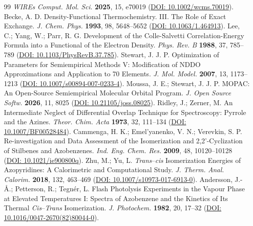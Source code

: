 \documentclass[11pt,a4paper]{article}
\begin{document}
\begin{thebibliography}{99}
  \textit{WIREs Comput. Mol. Sci.} \textbf{2025}, 15, e70019
  (\href{https://doi.org/10.1002/wcms.70019}{DOI: 10.1002/wcms.70019}).
 Becke, A. D. Density-Functional Thermochemistry. III. The Role of Exact Exchange.
  \textit{J. Chem. Phys.} \textbf{1993}, 98, 5648–5652
  (\href{https://doi.org/10.1063/1.464913}{DOI: 10.1063/1.464913}).
 Lee, C.; Yang, W.; Parr, R. G. Development of the Colle-Salvetti Correlation-Energy Formula
  into a Functional of the Electron Density. \textit{Phys. Rev. B} \textbf{1988}, 37, 785–789
  (\href{https://doi.org/10.1103/PhysRevB.37.785}{DOI: 10.1103/PhysRevB.37.785}).
 Stewart, J. J. P. Optimization of Parameters for Semiempirical Methods V: Modification
  of NDDO Approximations and Application to 70 Elements. \textit{J. Mol. Model.} \textbf{2007}, 13, 1173–1213
  (\href{https://doi.org/10.1007/s00894-007-0233-4}{DOI: 10.1007/s00894-007-0233-4}).
 Moussa, J. E.; Stewart, J. J. P. MOPAC: An Open-Source Semiempirical Molecular Orbital
  Program. \textit{J. Open Source Softw.} \textbf{2026}, 11, 8025
  (\href{https://doi.org/10.21105/joss.08025}{DOI: 10.21105/joss.08025}).
 Ridley, J.; Zerner, M. An Intermediate Neglect of Differential Overlap Technique for
  Spectroscopy: Pyrrole and the Azines. \textit{Theor. Chim. Acta} \textbf{1973}, 32, 111–134
  (\href{https://doi.org/10.1007/BF00528484}{DOI: 10.1007/BF00528484}).
 Cammenga, H. K.; Emel'yanenko, V. N.; Verevkin, S. P. Re-investigation and Data
  Assessment of the Isomerization and 2,2'-Cyclization of Stilbenes and Azobenzenes.
  \textit{Ind. Eng. Chem. Res.} \textbf{2009}, 48, 10120–10128
  (\href{https://doi.org/10.1021/ie900800q}{DOI: 10.1021/ie900800q}).
 Zhu, M.; Yu, L. \textit{Trans}–\textit{cis} Isomerization Energies of Azopyridines:
  A Calorimetric and Computational Study. \textit{J. Therm. Anal. Calorim.} \textbf{2018}, 132, 463–469
  (\href{https://doi.org/10.1007/s10973-017-6913-0}{DOI: 10.1007/s10973-017-6913-0}).
 Andersson, J.-Å.; Petterson, R.; Tegnér, L. Flash Photolysis Experiments in the Vapour
  Phase at Elevated Temperatures I: Spectra of Azobenzene and the Kinetics of Its Thermal
  \textit{Cis}–\textit{Trans} Isomerization. \textit{J. Photochem.} \textbf{1982}, 20, 17–32
  (\href{https://doi.org/10.1016/0047-2670(82)80044-0}{DOI: 10.1016/0047-2670(82)80044-0}).
\end{thebibliography}
\end{document}
